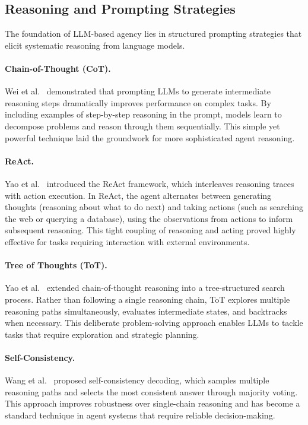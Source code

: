 \documentclass[11pt,a4paper]{article}
\begin{document}
\subsection{Reasoning and Prompting Strategies}

The foundation of LLM-based agency lies in structured prompting strategies that elicit systematic reasoning from language models.

\paragraph{Chain-of-Thought (CoT).} Wei et al.~\citep{wei2022chain} demonstrated that prompting LLMs to generate intermediate reasoning steps dramatically improves performance on complex tasks. By including examples of step-by-step reasoning in the prompt, models learn to decompose problems and reason through them sequentially. This simple yet powerful technique laid the groundwork for more sophisticated agent reasoning.

\paragraph{ReAct.} Yao et al.~\citep{yao2023react} introduced the ReAct framework, which interleaves reasoning traces with action execution. In ReAct, the agent alternates between generating thoughts (reasoning about what to do next) and taking actions (such as searching the web or querying a database), using the observations from actions to inform subsequent reasoning. This tight coupling of reasoning and acting proved highly effective for tasks requiring interaction with external environments.

\paragraph{Tree of Thoughts (ToT).} Yao et al.~\citep{yao2024tree} extended chain-of-thought reasoning into a tree-structured search process. Rather than following a single reasoning chain, ToT explores multiple reasoning paths simultaneously, evaluates intermediate states, and backtracks when necessary. This deliberate problem-solving approach enables LLMs to tackle tasks that require exploration and strategic planning.

\paragraph{Self-Consistency.} Wang et al.~\citep{wang2024selfconsistency} proposed self-consistency decoding, which samples multiple reasoning paths and selects the most consistent answer through majority voting. This approach improves robustness over single-chain reasoning and has become a standard technique in agent systems that require reliable decision-making.
\end{document}
